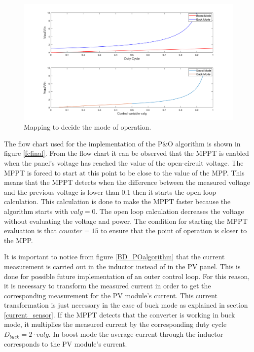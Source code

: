 \begin{figure}[H]
	\begin{center}
		\includegraphics[width=1\textwidth]{../Pictures/decision_mode_operation}
		\caption{Mapping to decide the mode of operation.}
		\label{fig:mappingtf} 
	\end{center}	
\end{figure}


The flow chart used for the implementation of the P\&O algorithm is shown in figure \ref{fcfinal}. From the flow chart it can be observed that the MPPT is enabled when the panel's voltage has reached the value of the open-circuit voltage. The MPPT is forced to start at this point to be close to the value of the MPP. This means that the MPPT detects when the difference between the measured voltage and the previous voltage is lower than 0.1 then it starts the open loop calculation. This calculation is done to make the MPPT faster because the algorithm starts with $valg = 0$. The open loop calculation decreases the voltage without evaluating the voltage and power. The condition for starting the MPPT evaluation is that $counter=15$ to ensure that the point of operation is closer to the MPP. 

It is important to notice from figure \ref{BD_POalgorithm} that the current measurement is carried out in the inductor instead of in the PV panel. This is done for possible future implementation of an outer control loop. For this reason, it is necessary to transform the measured current in order to get the corresponding measurement for the PV module's current. This current transformation is just necessary in the case of buck mode as explained in section \ref{current_sensor}. If the MPPT detects that the converter is working in buck mode, it multiplies the measured current by the corresponding duty cycle $D_{buck}=2\cdot valg$. In boost mode the average current through the inductor corresponds to the PV module's current. 

